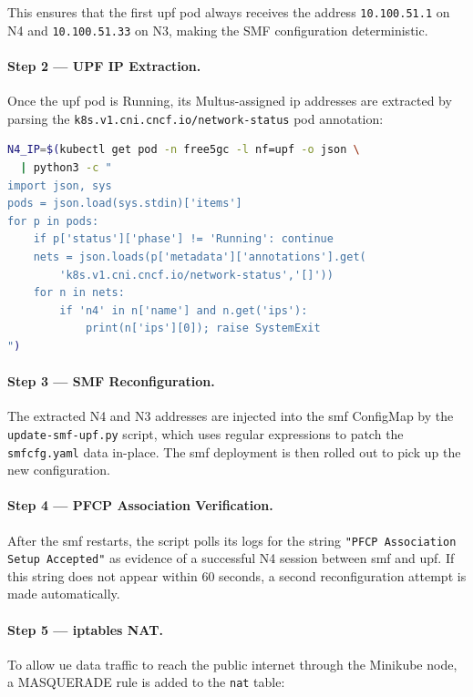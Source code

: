 This ensures that the first \gls{upf} pod always receives the address \texttt{10.100.51.1} on N4 and \texttt{10.100.51.33} on N3, making the SMF configuration deterministic.

\paragraph{Step 2 — UPF IP Extraction.} Once the \gls{upf} pod is Running, its Multus-assigned \gls{ip} addresses are extracted by parsing the \texttt{k8s.v1.cni.cncf.io/network-status} pod annotation:

\begin{lstlisting}[language=bash, caption={Extracting the UPF N4 IP address from pod annotations}, label={lst:upf_ip_extract}]
N4_IP=$(kubectl get pod -n free5gc -l nf=upf -o json \
  | python3 -c "
import json, sys
pods = json.load(sys.stdin)['items']
for p in pods:
    if p['status']['phase'] != 'Running': continue
    nets = json.loads(p['metadata']['annotations'].get(
        'k8s.v1.cni.cncf.io/network-status','[]'))
    for n in nets:
        if 'n4' in n['name'] and n.get('ips'):
            print(n['ips'][0]); raise SystemExit
")
\end{lstlisting}

\paragraph{Step 3 — SMF Reconfiguration.} The extracted N4 and N3 addresses are injected into the \gls{smf} ConfigMap by the \texttt{update-smf-upf.py} script, which uses regular expressions to patch the \texttt{smfcfg.yaml} data in-place. The \gls{smf} deployment is then rolled out to pick up the new configuration.

\paragraph{Step 4 — PFCP Association Verification.} After the \gls{smf} restarts, the script polls its logs for the string \texttt{"PFCP Association Setup Accepted"} as evidence of a successful N4 session between \gls{smf} and \gls{upf}. If this string does not appear within 60 seconds, a second reconfiguration attempt is made automatically.

\paragraph{Step 5 — iptables NAT.} To allow \gls{ue} data traffic to reach the public internet through the Minikube node, a MASQUERADE rule is added to the \texttt{nat} table:

